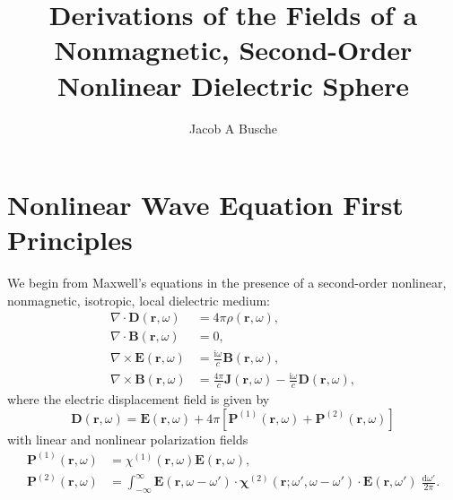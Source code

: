\documentclass{article}
\begin{document}
\title{Derivations of the Fields of a Nonmagnetic, Second-Order Nonlinear Dielectric Sphere}
\author{Jacob A Busche}
\maketitle

\section{Nonlinear Wave Equation First Principles}\label{sec:nonlinearFirstPrinciplesClassical}

We begin from Maxwell's equations in the presence of a second-order nonlinear, nonmagnetic, isotropic, local dielectric medium:
\begin{equation}
\begin{split}
\nabla\cdot\mathbf{D}(\mathbf{r},\omega) &= 4\pi\rho(\mathbf{r},\omega),\\
\nabla\cdot\mathbf{B}(\mathbf{r},\omega) &= 0,\\
\nabla\times\mathbf{E}(\mathbf{r},\omega) &= \frac{\mathrm{i}\omega}{c}\mathbf{B}(\mathbf{r},\omega),\\
\nabla\times\mathbf{B}(\mathbf{r},\omega) &= \frac{4\pi}{c}\mathbf{J}(\mathbf{r},\omega) - \frac{\mathrm{i}\omega}{c}\mathbf{D}(\mathbf{r},\omega),
\end{split}
\end{equation}
where the electric displacement field is given by
\begin{equation}
\mathbf{D}(\mathbf{r},\omega) = \mathbf{E}(\mathbf{r},\omega) + 4\pi\left[\mathbf{P}^{(1)}(\mathbf{r},\omega) + \mathbf{P}^{(2)}(\mathbf{r},\omega)\right]
\end{equation}
with linear and nonlinear polarization fields
\begin{equation}
\begin{split}
\mathbf{P}^{(1)}(\mathbf{r},\omega) &= \chi^{(1)}(\mathbf{r},\omega)\mathbf{E}(\mathbf{r},\omega),\\
\mathbf{P}^{(2)}(\mathbf{r},\omega) &= \int_{-\infty}^\infty\mathbf{E}(\mathbf{r},\omega - \omega')\cdot\bm{\chi}^{(2)}(\mathbf{r};\omega',\omega - \omega')\cdot\mathbf{E}(\mathbf{r},\omega')\;\frac{\mathrm{d}\omega'}{2\pi}.
\end{split}
\end{equation}
\end{document}
